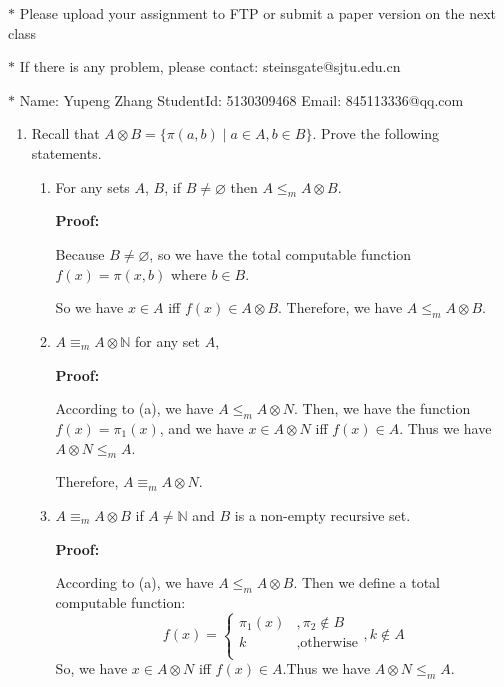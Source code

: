 \documentclass[12pt,a4paper]{article}
\theoremstyle{definition}
\numberwithin{equation}{section}
\numberwithin{figure}{section}
\begin{document}
\noindent

\noindent{}
\begin{center}
\footnotesize{\color{red}$*$ Please upload your assignment to FTP or submit a paper version on the next class}

\footnotesize{\color{red}$*$ If there is any problem, please contact: steinsgate@sjtu.edu.cn}

\footnotesize{\color{blue}$*$ Name: Yupeng Zhang \quad StudentId: 5130309468 \quad Email: 845113336@qq.com}
\end{center}
\begin{enumerate}
  \item   Recall that $A\otimes B=\{\pi (a,b) \mid a\in A, b\in B\}$. Prove the following statements.
\begin{enumerate}
    \item For any sets $A$, $B$, if $B\neq \varnothing$ then $A\leq_m A\otimes B$.
    
    \textbf{Proof:}
       
    Because $B \neq \varnothing$, so we have the total computable function $f(x) = \pi(x,b)$ where $b \in B$.
    
    So we have $x \in A$ iff $f(x) \in  A \otimes B$. Therefore, we have $A \leq_m A \otimes B$.
    
    \item $A\equiv_m A\otimes \mathbb{N}$ for any set $A$,
    
        
    \textbf{Proof:}
    
    According to (a), we have $A \leq_m A \otimes N$.  Then, we have the function $f(x) = \pi_1(x)$, and we have $x \in A \otimes N$ iff $f(x) \in A$. Thus we have $A \otimes N \leq_m A$. 
    
    Therefore, $A \equiv_m A \otimes N$.
    
    
    \item $A\equiv_m A\otimes B$ if $A\neq \mathbb{N}$ and $B$ is a non-empty recursive set.
        
    \textbf{Proof:}
    
    According to (a), we have $A \leq_m A \otimes B$. Then we define a total computable function:
    $$f(x) = \begin{cases} \pi_1(x) &,\pi_2 \notin B\\
            k &, \mbox{otherwise}\\
 \end{cases} , k \notin A$$
 So, we have $x \in A \otimes N$ iff $f(x) \in A$.Thus we have $A \otimes N \leq_m A$. 
 

\end{enumerate}
\end{enumerate}
\end{document}
